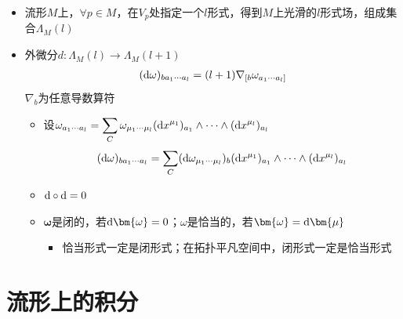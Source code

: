 \begin{itemize}
\begin{itemize}
\begin{align*}
            &=\frac{1}{l!} \omega_{\mu_1 \cdots \mu_l}  (\e^{\mu_1})_{a_1} \wedge \cdots \wedge (\e^{\mu_l})_{a_l}
        \end{align*}
        $\displaystyle \sum_{C}$代表对组合$C_n^l$的不同情况求和
    \end{itemize}
    \item 流形$M$上，$\forall p \in M$，在$V_p$处指定一个$l$形式，得到$M$上光滑的$l$形式场，组成集合$\Lambda_M(l)$
    \item 外微分$d:\Lambda_M(l) \to \Lambda_M(l+1)$
    \begin{gather*}
        (\mathrm{d} \omega)_{ba_1 \cdots a_l}=(l+1) \nabla_{[b} \omega_{a_1 \cdots a_l]}
    \end{gather*}
    $\nabla_b$为任意导数算符
    \begin{itemize}
        \item 设$\omega_{a_1 \cdots a_l}=\displaystyle \sum_{C} \omega_{\mu_1 \cdots \mu_l} (\mathrm{d} x^{\mu_1})_{a_1} \wedge \cdots \wedge (\mathrm{d} x^{\mu_l})_{a_l}$
        \begin{gather*}
            (\mathrm{d} \omega)_{ba_1 \cdots a_l}=\displaystyle \sum_{C} (\mathrm{d} \omega_{\mu_1 \cdots \mu_l})_b (\mathrm{d} x^{\mu_1})_{a_1} \wedge \cdots \wedge (\mathrm{d} x^{\mu_l})_{a_l}
        \end{gather*}
        \item $\mathrm{d} \circ \mathrm{d} = 0$
        \item $\bm{\omega}$是闭的，若$\d \bm{\omega}=0$；$\omega$是恰当的，若$\bm{\omega}=\d \bm{\mu}$
        \begin{itemize}
            \item 恰当形式一定是闭形式；在拓扑平凡空间中，闭形式一定是恰当形式
        \end{itemize}
    \end{itemize}
\end{itemize}

\section{流形上的积分}


